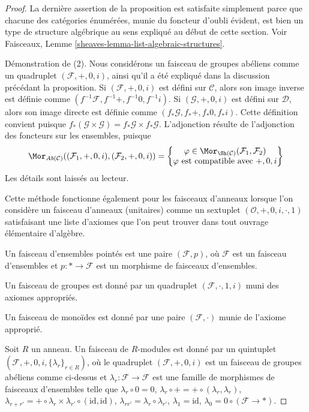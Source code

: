 \begin{proof}
La dernière assertion de la proposition est satisfaite simplement parce que chacune des
catégories énumérées, munie du foncteur d'oubli évident, est bien un type de
structure algébrique au sens expliqué au début de cette section.
Voir Faisceaux, Lemme \ref{sheaves-lemma-list-algebraic-structures}.

\medskip\noindent
Démonstration de (2). Nous considérons un faisceau de groupes abéliens comme
un quadruplet $(\mathcal{F}, +, 0, i)$, ainsi qu'il a été expliqué dans la discussion précédant
la proposition.
Si $(\mathcal{F}, +, 0, i)$ est défini sur $\mathcal{C}$, alors son image inverse
est définie comme $(f^{-1}\mathcal{F}, f^{-1}+, f^{-1}0, f^{-1}i)$.
Si $(\mathcal{G}, +, 0, i)$ est défini sur $\mathcal{D}$, alors son image directe
est définie comme $(f_*\mathcal{G}, f_*+, f_*0, f_*i)$. Cette définition convient puisque
$f_*(\mathcal{G} \times \mathcal{G}) = f_*\mathcal{G} \times f_*\mathcal{G}$.
L'adjonction résulte de l'adjonction des foncteurs sur les ensembles,
puisque
$$
\Mor_{\textit{Ab}(\mathcal{C})}
((\mathcal{F}_1, +, 0, i), (\mathcal{F}_2, +, 0, i))
=
\left\{
\begin{matrix}
\varphi \in \Mor_{\Sh(\mathcal{C})}
(\mathcal{F}_1, \mathcal{F}_2) \\
\varphi \text{ est compatible avec }+, 0, i
\end{matrix}
\right\}
$$
Les détails sont laissés au lecteur.

\medskip\noindent
Cette méthode fonctionne également pour les faisceaux d'anneaux lorsque l'on considère
un faisceau d'anneaux (unitaires) comme un sextuplet
$(\mathcal{O}, + , 0, i, \cdot, 1)$ satisfaisant une liste
d'axiomes que l'on peut trouver dans tout ouvrage élémentaire
d'algèbre.

\medskip\noindent
Un faisceau d'ensembles pointés est une paire $(\mathcal{F}, p)$, où
$\mathcal{F}$ est un faisceau d'ensembles et $p : * \to \mathcal{F}$
est un morphisme de faisceaux d'ensembles.

\medskip\noindent
Un faisceau de groupes est donné par un quadruplet $(\mathcal{F}, \cdot, 1, i)$
muni des axiomes appropriés.

\medskip\noindent
Un faisceau de monoïdes est donné par une paire $(\mathcal{F}, \cdot)$
munie de l'axiome approprié.

\medskip\noindent
Soit $R$ un anneau. Un faisceau de $R$-modules est donné par
un quintuplet $(\mathcal{F}, +, 0, i, \{\lambda_r\}_{r \in R})$,
où le quadruplet $(\mathcal{F}, +, 0, i)$ est un faisceau de
groupes abéliens comme ci-dessus et $\lambda_r : \mathcal{F} \to \mathcal{F}$
est une famille de morphismes de faisceaux d'ensembles
telle que
$\lambda_r \circ 0 = 0$,
$\lambda_r \circ + = + \circ (\lambda_r, \lambda_r)$,
$\lambda_{r + r'} =
+ \circ \lambda_r \times \lambda_{r'} \circ (\text{id}, \text{id})$,
$\lambda_{rr'} = \lambda_r \circ \lambda_{r'}$,
$\lambda_1 = \text{id}$, $\lambda_0 = 0 \circ (\mathcal{F} \to *)$.
\end{proof}


